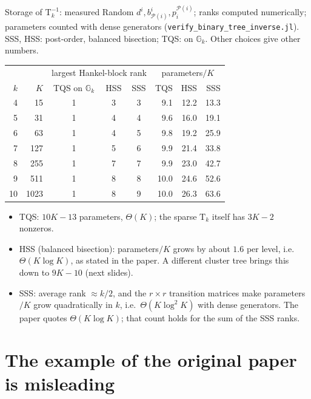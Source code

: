 \documentclass[aspectratio=169,11pt]{beamer}
\newcommand{\Par}{\mathcal{P}}            %
\begin{document}
\begin{frame}{Storage of $\mathrm{T}_k^{-1}$: measured}
\footnotesize
Random $d^i,b^i_{\Par(i)},p^{\Par(i)}_i$; ranks computed numerically; parameters counted with dense generators
(\texttt{verify\_binary\_tree\_inverse.jl}). SSS, HSS: post-order, balanced bisection; TQS: on $\mathbb{G}_k$.
Other choices give other numbers.

\vspace{1mm}
\centering
\renewcommand{\arraystretch}{1.0}
\begin{tabular}{rr|ccc|rrr}
\toprule
 & & \multicolumn{3}{c|}{largest Hankel-block rank} & \multicolumn{3}{c}{parameters$/K$} \\
$k$ & $K$ & TQS on $\mathbb{G}_k$ & HSS & SSS & TQS & HSS & SSS \\
\midrule
4 & 15 & 1 & 3 & 3 & 9.1 & 12.2 & 13.3 \\
5 & 31 & 1 & 4 & 4 & 9.6 & 16.0 & 19.1 \\
6 & 63 & 1 & 4 & 5 & 9.8 & 19.2 & 25.9 \\
7 & 127 & 1 & 5 & 6 & 9.9 & 21.4 & 33.8 \\
8 & 255 & 1 & 7 & 7 & 9.9 & 23.0 & 42.7 \\
9 & 511 & 1 & 8 & 8 & 10.0 & 24.6 & 52.6 \\
10 & 1023 & 1 & 8 & 9 & 10.0 & 26.3 & 63.6 \\
\bottomrule
\end{tabular}


\raggedright
\begin{itemize}
\item TQS: $10K-13$ parameters, $\Theta(K)$; the sparse $\mathrm{T}_k$ itself has $3K-2$ nonzeros.
\item HSS (balanced bisection): parameters$/K$ grows by about $1.6$ per level, i.e.\ $\Theta(K\log K)$, as stated
  in the paper. A different cluster tree brings this down to $9K-10$ (next slides).
\item SSS: average rank $\approx k/2$, and the $r\times r$ transition matrices make parameters$/K$ grow
  quadratically in $k$, i.e.\ $\Theta(K\log^2 K)$ with dense generators.
  The paper quotes $\Theta(K\log K)$; that count holds for the sum of the SSS ranks.
\end{itemize}
\end{frame}

\section{The example of the original paper is misleading}
\end{document}
